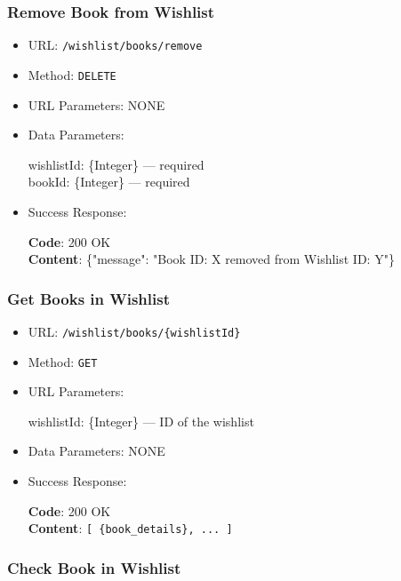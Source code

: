 \subsubsection*{Remove Book from Wishlist}

\begin{itemize}
    \item URL: \texttt{/wishlist/books/remove}
    \item Method: \texttt{DELETE}
    \item URL Parameters: NONE
    \item Data Parameters:

    wishlistId: \{Integer\} — required \\
    bookId: \{Integer\} — required

    \item Success Response: \newline

    \textbf{Code}: 200 OK \\
    \textbf{Content}: \{"message": "Book ID: X removed from Wishlist ID: Y"\}
\end{itemize}

\subsubsection*{Get Books in Wishlist}

\begin{itemize}
    \item URL: \texttt{/wishlist/books/\{wishlistId\}}
    \item Method: \texttt{GET}
    \item URL Parameters:

    wishlistId: \{Integer\} — ID of the wishlist

    \item Data Parameters: NONE

    \item Success Response: \newline

    \textbf{Code}: 200 OK \\
    \textbf{Content}: \texttt{[ \{book\_details\}, ... ]}
\end{itemize}

\subsubsection*{Check Book in Wishlist}

